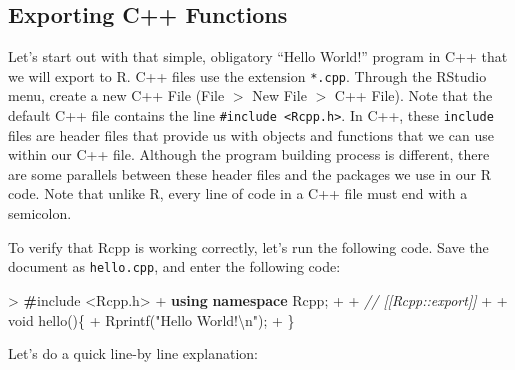 \documentclass[]{krantz}
\makeatletter
\newenvironment{Shaded}{\begin{snugshade}}{\end{snugshade}}
\newcommand{\CommentTok}[1]{\textcolor[rgb]{0.37,0.37,0.37}{\textit{#1}}}
\newcommand{\DataTypeTok}[1]{\textcolor[rgb]{0.27,0.27,0.27}{#1}}
\newcommand{\ErrorTok}[1]{\textcolor[rgb]{0.14,0.14,0.14}{\textbf{#1}}}
\newcommand{\KeywordTok}[1]{\textcolor[rgb]{0.27,0.27,0.27}{\textbf{#1}}}
\newcommand{\NormalTok}[1]{#1}
\newcommand{\SpecialCharTok}[1]{\textcolor[rgb]{0,0,0}{#1}}
\newcommand{\StringTok}[1]{\textcolor[rgb]{0.5,0.5,0.5}{#1}}
\newenvironment{kframe}{%
\medskip{}
\setlength{\fboxsep}{.8em}
 \def\at@end@of@kframe{}%
 \ifinner\ifhmode%
  \def\at@end@of@kframe{\end{minipage}}%
  \begin{minipage}{\columnwidth}%
 \fi\fi%
 \def\FrameCommand##1{\hskip\@totalleftmargin \hskip-\fboxsep
 \colorbox{shadecolor}{##1}\hskip-\fboxsep
     \hskip-\linewidth \hskip-\@totalleftmargin \hskip\columnwidth}%
 \MakeFramed {\advance\hsize-\width
   \@totalleftmargin\z@ \linewidth\hsize
   \@setminipage}}%
 {\par\unskip\endMakeFramed%
 \at@end@of@kframe}
\renewenvironment{Shaded}{\begin{kframe}}{\end{kframe}}
\makeatother
\begin{document}
\hypertarget{exporting-c-functions}{%
\subsection{Exporting C++ Functions}\label{exporting-c-functions}}

Let's start out with that simple, obligatory ``Hello World!'' program in C++ that we will export to R. C++ files use the extension \texttt{*.cpp}. Through the RStudio menu, create a new C++ File (File \(>\) New File \(>\) C++ File). Note that the default C++ file contains the line \texttt{\#include\ \textless{}Rcpp.h\textgreater{}}. In C++, these \texttt{include} files are header files that provide us with objects and functions that we can use within our C++ file. Although the program building process is different, there are some parallels between these header files and the packages we use in our R code. Note that unlike R, every line of code in a C++ file must end with a semicolon.

To verify that Rcpp is working correctly, let's run the following code. Save the document as \texttt{hello.cpp}, and enter the following code:

\begin{Shaded}
\begin{Highlighting}[]
\NormalTok{> }\ErrorTok{#}\NormalTok{include <Rcpp.h>}
\NormalTok{+ }\KeywordTok{using} \KeywordTok{namespace}\NormalTok{ Rcpp;}
\NormalTok{+ }
\NormalTok{+ }\CommentTok{// [[Rcpp::export]]}
\NormalTok{+ }
\NormalTok{+ }\DataTypeTok{void}\NormalTok{ hello()\{}
\NormalTok{+   Rprintf(}\StringTok{"Hello World!}\SpecialCharTok{\textbackslash{}n}\StringTok{"}\NormalTok{);}
\NormalTok{+ \}}
\end{Highlighting}
\end{Shaded}

Let's do a quick line-by line explanation:
\end{document}
